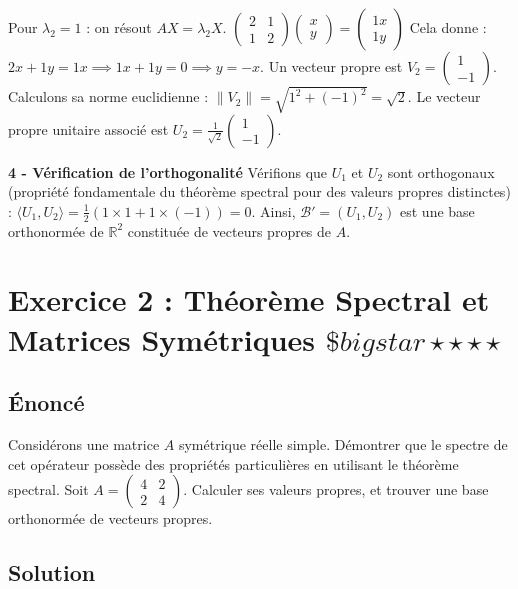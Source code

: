 \documentclass[11pt,a4paper]{article}
\begin{document}
Pour $\lambda_2 = 1$ : on résout $AX = \lambda_2 X$.
$\begin{pmatrix} 2 & 1 \\ 1 & 2 \end{pmatrix} \begin{pmatrix} x \\ y \end{pmatrix} = \begin{pmatrix} 1x \\ 1y \end{pmatrix}$
Cela donne :
$2x + 1y = 1x \implies 1x + 1y = 0 \implies y = -x$.
Un vecteur propre est $V_2 = \begin{pmatrix} 1 \\ -1 \end{pmatrix}$.
Calculons sa norme euclidienne : $\|V_2\| = \sqrt{1^2 + (-1)^2} = \sqrt{2}$.
Le vecteur propre unitaire associé est $U_2 = \frac{1}{\sqrt{2}} \begin{pmatrix} 1 \\ -1 \end{pmatrix}$.

\textbf{4 - Vérification de l'orthogonalité}
Vérifions que $U_1$ et $U_2$ sont orthogonaux (propriété fondamentale du théorème spectral pour des valeurs propres distinctes) :
$\langle U_1, U_2 \rangle = \frac{1}{2} (1 \times 1 + 1 \times (-1)) = 0$.
Ainsi, $\mathcal{B}' = (U_1, U_2)$ est une base orthonormée de $\mathbb{R}^2$ constituée de vecteurs propres de $A$.

\newpage
\section{Exercice 2 : Théorème Spectral et Matrices Symétriques \quad $\$bigstar\star\star\star\star$}

\subsection{Énoncé}
Considérons une matrice $A$ symétrique réelle simple.
Démontrer que le spectre de cet opérateur possède des propriétés particulières en utilisant le théorème spectral.
Soit $A = \begin{pmatrix} 4 & 2 \\ 2 & 4 \end{pmatrix}$.
Calculer ses valeurs propres, et trouver une base orthonormée de vecteurs propres.

\subsection{Solution}
\end{document}
